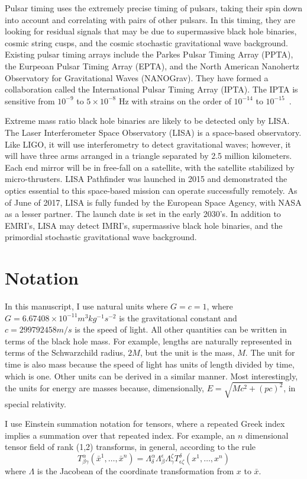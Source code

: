 Pulsar timing uses the extremely precise timing of pulsars, taking their spin down into account and correlating with pairs of other pulsars. In this timing, they are looking for residual signals that may be due to supermassive black hole binaries, cosmic string cusps, and the cosmic stochastic gravitational wave background. Existing pulsar timing arrays include the Parkes Pulsar Timing Array (PPTA), the Eurpeoan Pulsar Timing Array (EPTA), and the North American Nanohertz Observatory for Gravitational Waves (NANOGrav). They have formed a collaboration called the International Pulsar Timing Array (IPTA). The IPTA is sensitive from $10^{-9}$ to $5\times10^{-8}$ Hz with strains on the order of $10^{-14}$ to $10^{-15}$~\cite{hobbs_dai}.



Extreme mass ratio black hole binaries are likely to be detected only by LISA. The Laser Interferometer Space Observatory (LISA) is a space-based observatory. Like LIGO, it will use interferometry to detect gravitational waves; however, it will have three arms arranged in a triangle separated by 2.5 million kilometers. Each end mirror will be in free-fall on a satellite, with the satellite stabilized by micro-thrusters. LISA Pathfinder was launched in 2015 and demonstrated the optics essential to this space-based mission can operate successfully remotely. As of June of 2017, LISA is fully funded by the European Space Agency, with NASA as a lesser partner. The launch date is set in the early 2030's. In addition to EMRI's, LISA may detect IMRI's, supermassive black hole binaries, and the primordial stochastic gravitational wave background.


\section{Notation}
In this manuscript, I use natural units where $G=c=1$, where $G=6.67408\times 10^{-11} m^3kg^{-1}s^{-2}$ is the gravitational constant and $c=299792458 m/s$ is the speed of light. All other quantities can be written in terms of the black hole mass. For example, lengths are naturally represented in terms of the Schwarzchild radius, $2M$, but the unit is the mass, $M$. The unit for time is also mass because the speed of light has units of length divided by time, which is one. Other units can be derived in a similar manner. Most interestingly, the units for energy are masses because, dimensionally, $E=\sqrt{Mc^2+(pc)^2}$, in special relativity. 

I use Einstein summation notation for tensors, where a repeated Greek index implies a summation over that repeated index. For example, an $n$ dimensional tensor field of rank (1,2) transforms, in general, according to the rule
\begin{equation}
  T^\alpha_{\beta\gamma}(\bar{x}^1,\ldots,\bar{x}^n)=\Lambda^\alpha_\delta\Lambda^\epsilon_\beta\Lambda^\zeta_\gamma T^\delta_{\epsilon\zeta}(x^1,\ldots,x^n)
\end{equation}
where $\Lambda$ is the Jacobean of the coordinate transformation from $x$ to $\bar{x}$. 

